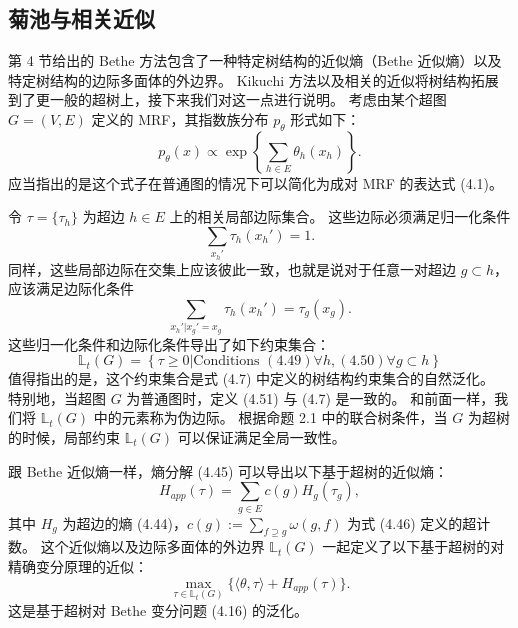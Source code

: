 \subsection{菊池与相关近似}

第 4 节给出的 Bethe 方法包含了一种特定树结构的近似熵（Bethe 近似熵）以及特定树结构的边际多面体的外边界。
Kikuchi 方法以及相关的近似将树结构拓展到了更一般的超树上，接下来我们对这一点进行说明。
考虑由某个超图 $G = (V, E)$ 定义的 MRF，其指数族分布 $p_{\theta}$ 形式如下：
\begin{equation}
    p_{\theta}(x) \propto \exp\left\{\sum_{h \in E}\theta_h(x_h)\right\}.
\end{equation}
应当指出的是这个式子在普通图的情况下可以简化为成对 MRF 的表达式 (4.1)。

令 $\tau = \{\tau_h\}$ 为超边 $h \in E$ 上的相关局部边际集合。
这些边际必须满足归一化条件
\begin{equation}
    \sum_{x_h'}\tau_h(x_h') = 1.
\end{equation}
同样，这些局部边际在交集上应该彼此一致，也就是说对于任意一对超边 $g \subset h$，应该满足边际化条件
\begin{equation}
    \sum_{x_h'|x_g' = x_g}\tau_h(x_h') = \tau_g(x_g).
\end{equation}
这些归一化条件和边际化条件导出了如下约束集合：
\begin{equation}
    \mathbb{L}_t(G) = \left\{\tau \geq 0| \text{Conditions } (4.49) \forall h, (4.50) \forall g \subset h\right\}
\end{equation}
值得指出的是，这个约束集合是式 (4.7) 中定义的树结构约束集合的自然泛化。
特别地，当超图 $G$ 为普通图时，定义 (4.51) 与 (4.7) 是一致的。
和前面一样，我们将 $\mathbb{L}_t(G)$ 中的元素称为伪边际。
根据命题 2.1 中的联合树条件，当 $G$ 为超树的时候，局部约束 $\mathbb{L}_t(G)$ 可以保证满足全局一致性。

跟 Bethe 近似熵一样，熵分解 (4.45) 可以导出以下基于超树的近似熵：
\begin{equation}
    H_{app}(\tau) = \sum_{g \in E}c(g)H_g(\tau_g), 
\end{equation}
其中 $H_g$ 为超边的熵 (4.44)，$c(g) := \sum_{f \supseteq g}\omega(g, f)$ 为式 (4.46) 定义的超计数。
这个近似熵以及边际多面体的外边界 $\mathbb{L}_t(G)$ 一起定义了以下基于超树的对精确变分原理的近似：
\begin{equation}
    \max_{\tau \in \mathbb{L}_t(G)}\{\langle\theta, \tau\rangle + H_{app}(\tau)\}.
\end{equation}
这是基于超树对 Bethe 变分问题 (4.16) 的泛化。

